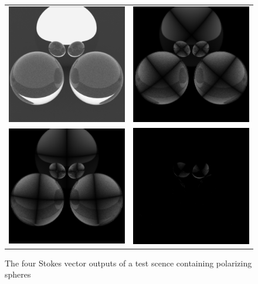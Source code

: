 \begin{figure}[h]
	\begin{tabular}{cc}
		\includegraphics[width=.45\linewidth]{img/polarizing_spheres.s0.png}
		&
		\includegraphics[width=.45\linewidth]{img/polarizing_spheres.s1.png} \\
		\includegraphics[width=.45\linewidth]{img/polarizing_spheres.s2.png}
		&
		\includegraphics[width=.45\linewidth]{img/polarizing_spheres.s3.png}
	\end{tabular}
	\caption{The four Stokes vector outputs of a test scence containing polarizing spheres}
	\label{fig:polar_spheres}
\end{figure}

